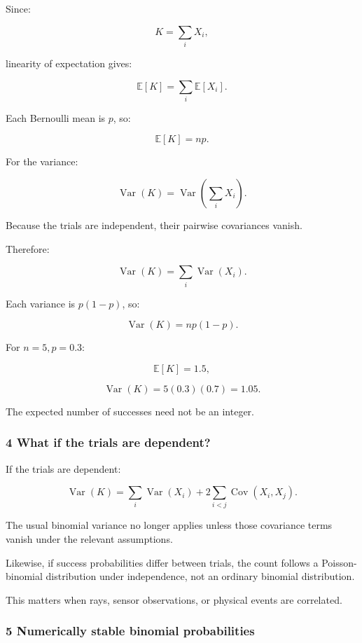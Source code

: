\hypertarget{02-foundations-ii-ch023-deriving-mean-and-variance}{}

Since:

\[
 K=\sum_iX_i,
\]

linearity of expectation gives:

\[
 \mathbb E[K]=\sum_i\mathbb E[X_i].
\]

Each Bernoulli mean is \(p\), so:

\[
 \boxed{\mathbb E[K]=np}.
\]

For the variance:

\[
 \operatorname{Var}(K) = \operatorname{Var}\left(\sum_iX_i\right).
\]

Because the trials are independent, their pairwise covariances vanish.

Therefore:

\[
 \operatorname{Var}(K)= \sum_i\operatorname{Var}(X_i).
\]

Each variance is \(p(1-p)\), so:

\[
 \boxed{ \operatorname{Var}(K)=np(1-p) }.
\]

For \(n=5,p=0.3\):

\[
 \mathbb E[K]=1.5,
\]

\[
 \operatorname{Var}(K)=5(0.3)(0.7)=1.05.
\]

The expected number of successes need not be an integer.

\subsubsection{4 What if the trials are dependent?}\label{02-foundations-ii-ch023-what-if-the-trials-are-dependent}

\hypertarget{02-foundations-ii-ch023-what-if-the-trials-are-dependent}{}

If the trials are dependent:

\[
 \operatorname{Var}(K)= \sum_i\operatorname{Var}(X_i) + 2\sum_{i<j}\operatorname{Cov}(X_i,X_j).
\]

The usual binomial variance no longer applies unless those covariance terms vanish under the relevant assumptions.

Likewise, if success probabilities differ between trials, the count follows a Poisson-binomial distribution under independence, not an ordinary binomial distribution.

This matters when rays, sensor observations, or physical events are correlated.

\subsubsection{5 Numerically stable binomial probabilities}\label{02-foundations-ii-ch023-numerically-stable-binomial-probabilities}

